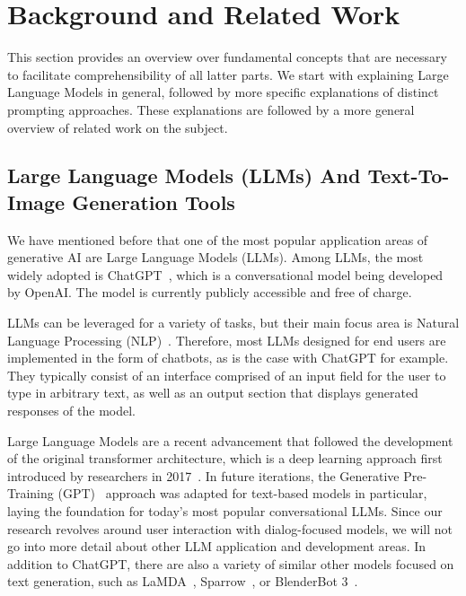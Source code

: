 \section{Background and Related Work}
\label{sec:background-and-related-work}

This section provides an overview over fundamental concepts that are necessary to
facilitate comprehensibility of all latter parts.
We start with explaining Large Language Models in general, followed by more specific explanations
of distinct prompting approaches.
These explanations are followed by a more general overview of related work on the subject.


\subsection{Large Language Models (LLMs) And Text-To-Image Generation Tools}
\label{subsec:large-language-models-(llms)}
We have mentioned before that one of the most popular application areas of generative AI
are Large Language Models (LLMs).
Among LLMs, the most widely adopted is ChatGPT~\cite{openai_chatgpt_2023}, which is a
conversational model being developed by OpenAI\@.
The model is currently publicly accessible and free of charge.

LLMs can be leveraged for a variety of tasks, but their main focus area is Natural Language Processing
(NLP)~\cite{radford_language_2018}.
Therefore, most LLMs designed for end users are implemented in the form of chatbots,
as is the case with ChatGPT for example.
They typically consist of an interface comprised of an input field for the user to type in arbitrary
text, as well as an output section that displays generated responses of the model.

Large Language Models are a recent advancement that followed the development of the original
transformer architecture, which is a deep learning approach first introduced by researchers in 2017~\cite{vaswani_attention_2017}.
In future iterations, the Generative Pre-Training (GPT)~\cite{radford_improving_2018} approach
was adapted for text-based models in particular, laying the foundation for today's most
popular conversational LLMs.
Since our research revolves around user interaction with dialog-focused models, we will not go into
more detail about other LLM application and development areas.
In addition to ChatGPT, there are also a variety of similar other models focused on text generation,
such as LaMDA~\cite{thoppilan_lamda_2022}, Sparrow~\cite{glaese_improving_2022}, or
BlenderBot 3~\cite{shuster_blenderbot_2022}.
\newline

